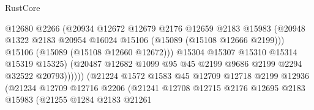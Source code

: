 \begin{lexlean}{RustCore}
\begin{coremodule}
                                        @12680
                                        @2266
                                        (@20934
                                          @12672
                                          @12679
                                          @2176
                                          @12659
                                          @2183
                                          @15983
                                          (@20948
                                            @1322
                                            @2183
                                            @20954
                                            @16024
                                            @15106
                                            (@15089 (@15108 @12666 @2199)))
                                          @15106
                                          (@15089 (@15108 @12660 @12672)))
                                        @15304
                                        @15307
                                        @15310
                                        @15314
                                        @15319
                                        @15325)
                                      (@20487
                                        @12682
                                        @1099
                                        @95
                                        @45
                                        @2199
                                        @9686
                                        @2199
                                        @2294
                                        @32522
                                        @20793))))))
                            (@21224
                              @1572
                              @1583
                              @45
                              @12709
                              @12718
                              @2199
                              @12936
                              (@21234
                                @12709
                                @12716
                                @2206
                                (@21241
                                  @12708
                                  @12715
                                  @2176
                                  @12695
                                  @2183
                                  @15983
                                  (@21255
                                    @1284
                                    @2183
                                    @21261

\end{coremodule}
\end{lexlean}
